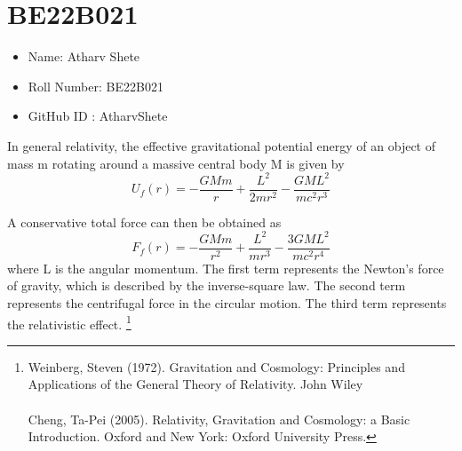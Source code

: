 \section*{BE22B021}
\begin{itemize}
    \item Name: Atharv Shete 
    \item Roll Number: BE22B021
    \item GitHub ID : AtharvShete
\end{itemize}

In general relativity, the effective gravitational potential energy of an object of mass m rotating around a massive central body M is given by
\begin{equation}
    U_f (r) = - \frac{GMm}{r} + \frac{L^2}{2mr^2} - \frac{GML^2}{mc^2r^3}
\end{equation}

A conservative total force can then be obtained as
\begin{equation}
    F_f (r) = - \frac{GMm}{r^2} + \frac{L^2}{mr^3} - \frac{3GML^2}{mc^2r^4}
\end{equation}
where L is the angular momentum. The first term represents the Newton's force of gravity, which is described by the inverse-square law. The second term represents the centrifugal force in the circular motion. The third term represents the relativistic effect.
\footnote{
Weinberg, Steven (1972). Gravitation and Cosmology: Principles and Applications of the General Theory of Relativity. John Wiley \\ \\
Cheng, Ta-Pei (2005). Relativity, Gravitation and Cosmology: a Basic Introduction. Oxford and New York: Oxford University Press.
}
